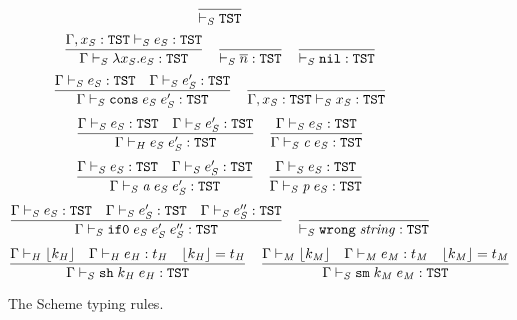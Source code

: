 \begin{figure}[p]
\caption{The Scheme typing rules.}
\[
\frac
{}
{ \vdash_{\mathit{S}} \mathtt{TST}}
\]
\bigskip
\[
\frac
{\Gamma , x_{\mathit{S}} : \mathtt{TST} \vdash_{\mathit{S}} e_{\mathit{S}} : \mathtt{TST}}
{\Gamma \vdash_{\mathit{S}} \lambda x_{\mathit{S}} . e_{\mathit{S}} : \mathtt{TST}}
\quad
\frac
{}
{ \vdash_{\mathit{S}} \overline{n} : \mathtt{TST}}
\quad
\frac
{}
{ \vdash_{\mathit{S}} \mathtt{nil} : \mathtt{TST}}
\]
\[
\frac
{\Gamma \vdash_{\mathit{S}} e_{\mathit{S}} : \mathtt{TST} \quad \Gamma \vdash_{\mathit{S}} e_{\mathit{S}}' : \mathtt{TST}}
{\Gamma \vdash_{\mathit{S}} \mathtt{cons} \; e_{\mathit{S}} \; e_{\mathit{S}}' : \mathtt{TST}}
\quad
\frac
{}
{\Gamma , x_{\mathit{S}} : \mathtt{TST} \vdash_{\mathit{S}} x_{\mathit{S}} : \mathtt{TST}}
\]
\[
\frac
{\Gamma \vdash_{\mathit{S}} e_{\mathit{S}} : \mathtt{TST} \quad \Gamma \vdash_{\mathit{S}} e_{\mathit{S}}' : \mathtt{TST}}
{\Gamma\vdash_{\mathit{H}}e_{\mathit{S}} \; e_{\mathit{S}}':\mathtt{TST}}
\quad
\frac
{\Gamma \vdash_{\mathit{S}} e_{\mathit{S}} : \mathtt{TST}}
{\Gamma \vdash_{\mathit{S}} \mathit{c} \; e_{\mathit{S}} : \mathtt{TST}}
\]
\[
\frac
{\Gamma \vdash_{\mathit{S}} e_{\mathit{S}} : \mathtt{TST} \quad \Gamma \vdash_{\mathit{S}} e_{\mathit{S}}' : \mathtt{TST}}
{\Gamma \vdash_{\mathit{S}} \mathit{a} \; e_{\mathit{S}} \; e_{\mathit{S}}' : \mathtt{TST}}
\quad
\frac
{\Gamma \vdash_{\mathit{S}} e_{\mathit{S}} : \mathtt{TST}}
{\Gamma \vdash_{\mathit{S}} \mathit{p} \; e_{\mathit{S}} : \mathtt{TST}}
\]
\[
\frac
{\Gamma \vdash_{\mathit{S}} e_{\mathit{S}} : \mathtt{TST} \quad \Gamma \vdash_{\mathit{S}} e_{\mathit{S}}' : \mathtt{TST} \quad \Gamma \vdash_{\mathit{S}} e_{\mathit{S}}'' : \mathtt{TST}}
{\Gamma \vdash_{\mathit{S}} \mathtt{if0} \; e_{\mathit{S}} \; e_{\mathit{S}}' \; e_{\mathit{S}}'' : \mathtt{TST}}
\quad
\frac
{}
{ \vdash_{\mathit{S}} \mathtt{wrong} \; \mathit{string} : \mathtt{TST}}
\]
\[
\frac
{\Gamma \vdash_{\mathit{H}} \lfloor k_{\mathit{H}} \rfloor \quad \Gamma \vdash_{\mathit{H}} e_{\mathit{H}} : t_{\mathit{H}} \quad \lfloor k_{\mathit{H}} \rfloor = t_{\mathit{H}}}
{\Gamma \vdash_{\mathit{S}} \mathtt{sh} \; k_{\mathit{H}} \; e_{\mathit{H}} : \mathtt{TST}}
\quad
\frac
{\Gamma \vdash_{\mathit{M}} \lfloor k_{\mathit{M}} \rfloor \quad \Gamma \vdash_{\mathit{M}} e_{\mathit{M}} : t_{\mathit{M}} \quad \lfloor k_{\mathit{M}} \rfloor = t_{\mathit{M}}}
{\Gamma \vdash_{\mathit{S}} \mathtt{sm} \; k_{\mathit{M}} \; e_{\mathit{M}} : \mathtt{TST}}
\]
\label{figstr}
\end{figure}
